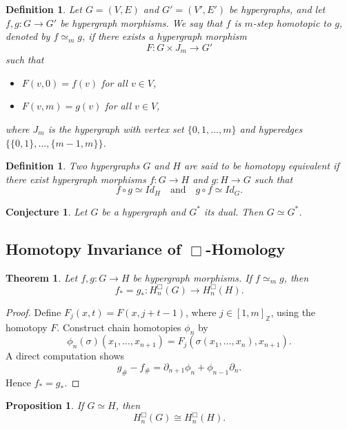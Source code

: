 \documentclass[11pt]{amsart}
\newtheorem{thm}{Theorem}[section]
\newtheorem{Def}[subsection]{Definition}
\newtheorem{Con}[subsection]{Conjecture}
\newtheorem{prop}[subsection]{Proposition}
\begin{document}
\begin{Def}
Let $G=(V,E)$ and $G'=(V',E')$ be hypergraphs, and let $f,g:G\rightarrow G'$ be hypergraph morphisms. We say that $f$ is \emph{$m$-step homotopic} to $g$, denoted by $f\simeq_m g$, if there exists a hypergraph morphism
\[
F:G\times J_m \rightarrow G'
\]
such that
\begin{itemize}
	\item $F(v,0)=f(v)$ for all $v\in V$,
	\item $F(v,m)=g(v)$ for all $v\in V$,
\end{itemize}
where $J_m$ is the hypergraph with vertex set $\{0,1,\ldots,m\}$ and hyperedges $\{\{0,1\},\ldots,\{m-1,m\}\}$.
\end{Def}

\begin{Def}
Two hypergraphs $G$ and $H$ are said to be \emph{homotopy equivalent} if there exist hypergraph morphisms $f:G\rightarrow H$ and $g:H\rightarrow G$ such that
\[
f\circ g \simeq Id_H \quad \text{and} \quad g\circ f \simeq Id_G.
\]
\end{Def}

\begin{Con}\label{dual HE}
	Let $G$ be a hypergraph and $G^*$ its dual. Then $G\simeq G^*$.
\end{Con}

\subsection{Homotopy Invariance of $\Box$-Homology}

\begin{thm}\label{thm 2}
Let $f,g:G\rightarrow H$ be hypergraph morphisms. If $f\simeq_m g$, then
\[
f_*= g_*:H_n^\Box(G)\rightarrow H_n^\Box(H).
\]
\end{thm}

\begin{proof}
	Define $F_j(x,t)=F(x,j+t-1)$, where $j\in [1,m]_{\mathbb{Z}}$, using the homotopy $F$. Construct chain homotopies $\phi_n$ by
	\[
	\phi_n(\sigma)(x_1,\ldots,x_{n+1})=F_j(\sigma(x_1,\ldots,x_n),x_{n+1}).
	\]
	A direct computation shows
	\[
	g_{\#}-f_{\#}=\partial_{n+1}\phi_n+\phi_{n-1}\partial_n.
	\]
	Hence $f_*=g_*$.
\end{proof}

\begin{prop}\label{homotopy equivalent}
	If $G\simeq H$, then
	\[
	H_n^\Box(G)\cong H_n^\Box(H).
	\]
\end{prop}
\end{document}
